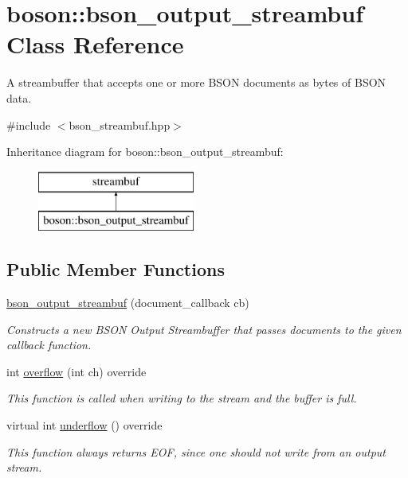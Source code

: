 \hypertarget{classboson_1_1bson__output__streambuf}{}\section{boson\+:\+:bson\+\_\+output\+\_\+streambuf Class Reference}
\label{classboson_1_1bson__output__streambuf}


A streambuffer that accepts one or more B\+S\+ON documents as bytes of B\+S\+ON data.  




{\ttfamily \#include $<$bson\+\_\+streambuf.\+hpp$>$}

Inheritance diagram for boson\+:\+:bson\+\_\+output\+\_\+streambuf\+:\begin{figure}[H]
\begin{center}
\leavevmode
\includegraphics[height=2.000000cm]{classboson_1_1bson__output__streambuf}
\end{center}
\end{figure}
\subsection*{Public Member Functions}
\begin{DoxyCompactItemize}
\item 
\hyperlink{classboson_1_1bson__output__streambuf_af2cea7a3bc88691f139eee1739b63e87}{bson\+\_\+output\+\_\+streambuf} (document\+\_\+callback cb)
\begin{DoxyCompactList}\small\item\em Constructs a new B\+S\+ON Output Streambuffer that passes documents to the given callback function. \end{DoxyCompactList}\item 
int \hyperlink{classboson_1_1bson__output__streambuf_a9bc80c765951f60ea01d9db6918c2b36}{overflow} (int ch) override
\begin{DoxyCompactList}\small\item\em This function is called when writing to the stream and the buffer is full. \end{DoxyCompactList}\item 
virtual int \hyperlink{classboson_1_1bson__output__streambuf_ad2f35382566529544c84fe03cd831a07}{underflow} () override
\begin{DoxyCompactList}\small\item\em This function always returns E\+OF, since one should not write from an output stream. \end{DoxyCompactList}\end{DoxyCompactItemize}


